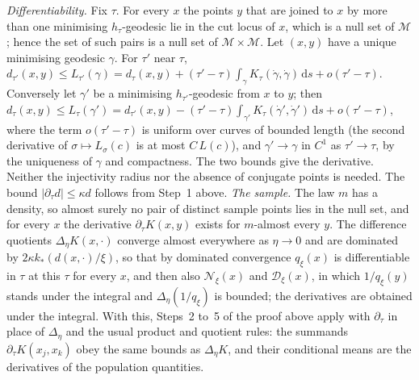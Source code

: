 \documentclass[11pt,a4paper]{article}
\makeatletter
\theoremstyle{stmt}
\theoremstyle{defn}
\theoremstyle{rmk}
\renewenvironment{proof}[1][\proofname]{\par\pushQED{\qed}\normalfont\topsep6\p@\@plus6\p@\relax
  \trivlist\item[\hskip\labelsep{\sffamily\itshape\small #1.}]\ignorespaces}{\popQED\endtrivlist\@endpefalse}
\numberwithin{equation}{section}
\newcommand{\M}{\mathcal{M}}
\newcommand{\dd}{\mathrm{d}}
\makeatother
\begin{document}
{\begin{proof}
\emph{Differentiability.} Fix $\tau$. For every $x$ the points $y$ that are joined to $x$ by more than one minimising $h_\tau$-geodesic lie in the cut locus of $x$, which is a null set of $\M$; hence the set of such pairs is a null set of $\M\times\M$. Let $(x,y)$ have a unique minimising geodesic $\gamma$. For $\tau'$ near $\tau$, $d_{\tau'}(x,y)\le L_{\tau'}(\gamma)=d_\tau(x,y)+(\tau'-\tau)\int_\gamma K_\tau(\dot\gamma,\dot\gamma)\,\dd s+o(\tau'-\tau)$. Conversely let $\gamma'$ be a minimising $h_{\tau'}$-geodesic from $x$ to $y$; then $d_\tau(x,y)\le L_\tau(\gamma')=d_{\tau'}(x,y)-(\tau'-\tau)\int_{\gamma'}K_\tau(\dot\gamma',\dot\gamma')\,\dd s+o(\tau'-\tau)$, where the term $o(\tau'-\tau)$ is uniform over curves of bounded length (the second derivative of $\sigma\mapsto L_\sigma(c)$ is at most $C\,L(c)$), and $\gamma'\to\gamma$ in $C^1$ as $\tau'\to\tau$, by the uniqueness of $\gamma$ and compactness. The two bounds give the derivative. Neither the injectivity radius nor the absence of conjugate points is needed. The bound $|\partial_\tau d|\le\kappa d$ follows from Step~1 above. \emph{The sample.} The law $m$ has a density, so almost surely no pair of distinct sample points lies in the null set, and for every $x$ the derivative $\partial_\tau K(x,y)$ exists for $m$-almost every $y$. The difference quotients $\Delta_\eta K(x,\cdot)$ converge almost everywhere as $\eta\to0$ and are dominated by $2\kappa k_*(d(x,\cdot)/\xi)$, so that by dominated convergence $q_\xi(x)$ is differentiable in $\tau$ at this $\tau$ for every $x$, and then also $\mathcal N_\xi(x)$ and $\mathcal D_\xi(x)$, in which $1/q_\xi(y)$ stands under the integral and $\Delta_\eta(1/q_\xi)$ is bounded; the derivatives are obtained under the integral. With this, Steps~2 to~5 of the proof above apply with $\partial_\tau$ in place of $\Delta_\eta$ and the usual product and quotient rules: the summands $\partial_\tau K(x_j,x_k)$ obey the same bounds as $\Delta_\eta K$, and their conditional means are the derivatives of the population quantities.
\end{proof}
}
\end{document}
